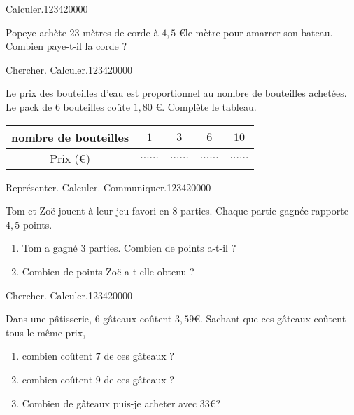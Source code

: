 \begin{pageParcoursd} 
 
\begin{ExoCd}{Calculer.}{1234}{2}{0}{0}{0}{0}

Popeye achète $23$ mètres de corde à $4,5$ \euro le mètre pour amarrer son bateau. 
\vspace{0.2cm}
Combien paye-t-il la corde ? 

\end{ExoCd}


\begin{ExoCd}{Chercher. Calculer.}{1234}{2}{0}{0}{0}{0}
 
Le prix des bouteilles d'eau est proportionnel au nombre de bouteilles achetées. Le pack de $6$ bouteilles coûte $1,80$ \euro. Complète le tableau.
\begin{center}
\begin{tabular}{|c|c|c|c|c|}
\hline 
nombre de bouteilles & $1$ & $3$ & $6$ & $10$ \\ 
\hline 
Prix (\euro) & $\ldots\ldots$ & $\ldots\ldots$ & $\ldots\ldots$ & $\ldots\ldots$   \\ 
\hline 
\end{tabular} 
\end{center}

\end{ExoCd}


\begin{ExoCd}{Représenter. Calculer. Communiquer.}{1234}{2}{0}{0}{0}{0}
  
Tom et Zoë jouent à leur jeu favori en $8$ parties. Chaque partie gagnée rapporte $4,5$ points. 

\begin{enumerate}[leftmargin=*]
\item Tom a gagné $3$ parties. Combien de points a-t-il ?
\item Combien de points Zoë a-t-elle obtenu ? 
\end{enumerate}
 
\end{ExoCd}


\begin{ExoCd}{Chercher. Calculer.}{1234}{2}{0}{0}{0}{0}
  
Dans une pâtisserie, $6$ gâteaux coûtent $3,59$\euro. Sachant que ces gâteaux coûtent tous le même prix,

\begin{enumerate}[leftmargin=*]
\item combien coûtent $7$ de ces gâteaux ?  
\item combien coûtent $9$ de ces gâteaux ? 
\item Combien de gâteaux puis-je acheter avec $33$\euro ?  
\end{enumerate}
\end{ExoCd}

\end{pageParcoursd}
